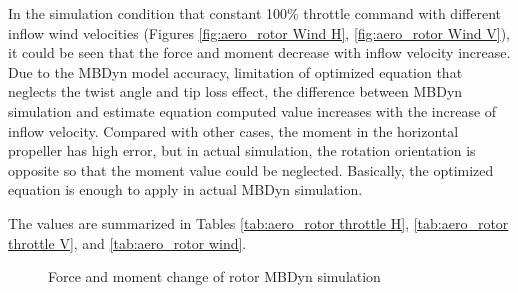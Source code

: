 In the simulation condition that constant 100\% throttle command with different inflow wind velocities (Figures \ref{fig:aero_rotor Wind H}, \ref{fig:aero_rotor Wind V}), it could be seen that the force and moment decrease with inflow velocity increase. Due to the MBDyn model accuracy, limitation of optimized equation that neglects the twist angle and tip loss effect, the difference between MBDyn simulation and estimate equation computed value increases with the increase of inflow velocity. Compared with other cases, the moment in the horizontal propeller has high error, but in actual simulation, the rotation orientation is opposite so that the moment value could be neglected. Basically, the optimized equation is enough to apply in actual MBDyn simulation.

The values are summarized in Tables \ref{tab:aero_rotor throttle H}, \ref{tab:aero_rotor throttle V}, and  \ref{tab:aero_rotor wind}.

\begin{figure}
    \centering
    \hfil %
    \hfil %
    \caption{Force and moment change of rotor MBDyn simulation}
    \label{fig:aero_rotor Mbdyn}
\end{figure}

